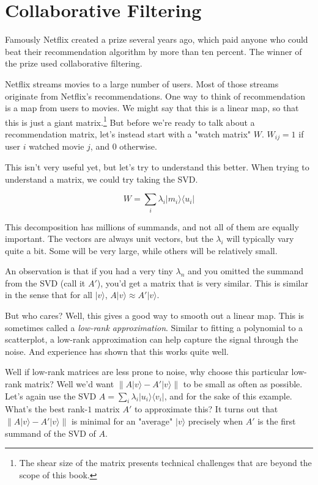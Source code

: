 \documentclass{amsbook}
\begin{document}
\section{Collaborative Filtering}

Famously Netflix created a prize several years ago, which paid anyone who could beat their recommendation algorithm by more than ten percent.  The winner of the prize used collaborative filtering.

Netflix streams movies to a large number of users.  Most of those streams originate from Netflix's recommendations.  One way to think of recommendation is a map from users to movies.  We might say that this is a linear map, so that this is just a giant matrix.\footnote{The shear size of the matrix presents technical challenges that are beyond the scope of this book.}  But before we're ready to talk about a recommendation matrix, let's instead start with a "watch matrix" $W$.  $W_{ij}=1$ if user $i$ watched movie $j$, and $0$ otherwise.

This isn't very useful yet, but let's try to understand this better.  When trying to understand a matrix, we could try taking the SVD.

$$
W=\sum_i\lambda_i|m_i\rangle\langle u_i|
$$

This decomposition has millions of summands, and not all of them are equally important.  The vectors are always unit vectors, but the $\lambda_i$ will typically vary quite a bit.  Some will be very large, while others will be relatively small.

An observation is that if you had a very tiny $\lambda_n$ and you omitted the summand from the SVD (call it $A'$), you'd get a matrix that is very similar.  This is similar in the sense that for all $|v\rangle$, $A|v\rangle\approx A'|v\rangle$.

But who cares?  Well, this gives a good way to smooth out a linear map.  This is sometimes called a {\em low-rank approximation}.  Similar to fitting a polynomial to a scatterplot, a low-rank approximation can help capture the signal through the noise.  And experience has shown that this works quite well.

Well if low-rank matrices are less prone to noise, why choose this particular low-rank matrix?  Well we'd want $\left\|A|v\rangle-A'|v\rangle\right\|$ to be small as often as possible.  Let's again use the SVD $A=\sum_i\lambda_i|u_i\rangle\langle v_i|$, and for the sake of this example.  What's the best rank-$1$ matrix $A'$ to approximate this?  It turns out that $\left\|A|v\rangle-A'|v\rangle\right\|$ is minimal for an "average" $|v\rangle$ precisely when $A'$ is the first summand of the SVD of $A$.
\end{document}
